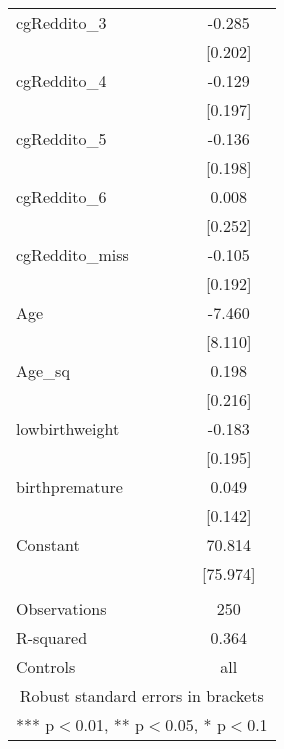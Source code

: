 \documentclass[]{article}
\begin{document}
\begin{tabular}{lc}
cgReddito\_3 & -0.285 \\
 & [0.202] \\
cgReddito\_4 & -0.129 \\
 & [0.197] \\
cgReddito\_5 & -0.136 \\
 & [0.198] \\
cgReddito\_6 & 0.008 \\
 & [0.252] \\
cgReddito\_miss & -0.105 \\
 & [0.192] \\
Age & -7.460 \\
 & [8.110] \\
Age\_sq & 0.198 \\
 & [0.216] \\
lowbirthweight & -0.183 \\
 & [0.195] \\
birthpremature & 0.049 \\
 & [0.142] \\
Constant & 70.814 \\
 & [75.974] \\
 &  \\
Observations & 250 \\
R-squared & 0.364 \\
 Controls & all \\ \hline
\multicolumn{2}{c}{ Robust standard errors in brackets} \\
\multicolumn{2}{c}{ *** p$<$0.01, ** p$<$0.05, * p$<$0.1} \\
\end{tabular}
\end{document}
